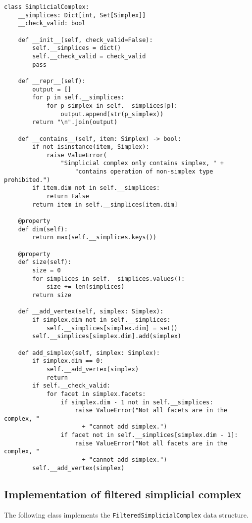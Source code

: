 \begin{verbatim}
class SimplicialComplex:
    __simplices: Dict[int, Set[Simplex]]
    __check_valid: bool

    def __init__(self, check_valid=False):
        self.__simplices = dict()
        self.__check_valid = check_valid
        pass

    def __repr__(self):
        output = []
        for p in self.__simplices:
            for p_simplex in self.__simplices[p]:
                output.append(str(p_simplex))
        return "\n".join(output)

    def __contains__(self, item: Simplex) -> bool:
        if not isinstance(item, Simplex):
            raise ValueError(
                "Simplicial complex only contains simplex, " +
                    "contains operation of non-simplex type prohibited.")
        if item.dim not in self.__simplices:
            return False
        return item in self.__simplices[item.dim]

    @property
    def dim(self):
        return max(self.__simplices.keys())

    @property
    def size(self):
        size = 0
        for simplices in self.__simplices.values():
            size += len(simplices)
        return size

    def __add_vertex(self, simplex: Simplex):
        if simplex.dim not in self.__simplices:
            self.__simplices[simplex.dim] = set()
        self.__simplices[simplex.dim].add(simplex)

    def add_simplex(self, simplex: Simplex):
        if simplex.dim == 0:
            self.__add_vertex(simplex)
            return
        if self.__check_valid:
            for facet in simplex.facets:
                if simplex.dim - 1 not in self.__simplices:
                    raise ValueError("Not all facets are in the complex, "
                      + "cannot add simplex.")
                if facet not in self.__simplices[simplex.dim - 1]:
                    raise ValueError("Not all facets are in the complex, "
                      + "cannot add simplex.")
        self.__add_vertex(simplex)
\end{verbatim}

\subsection{Implementation of filtered simplicial complex}

The following class implements the \texttt{FilteredSimplicialComplex} data structure.

